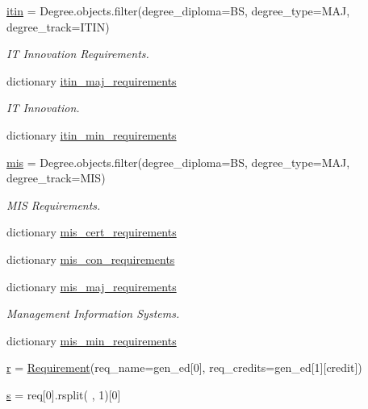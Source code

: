 \begin{DoxyCompactItemize}
\mbox{\hyperlink{namespacemavAgenda_1_1RequirementPreprocessing_ae97c34915a96370651628305d87909c2}{itin}} = Degree.\+objects.\+filter(degree\+\_\+diploma=\textquotesingle{}BS\textquotesingle{}, degree\+\_\+type=\textquotesingle{}M\+AJ\textquotesingle{}, degree\+\_\+track=\textquotesingle{}I\+T\+IN\textquotesingle{})
\begin{DoxyCompactList}\small\item\em IT Innovation Requirements. \end{DoxyCompactList}\item 
dictionary \mbox{\hyperlink{namespacemavAgenda_1_1RequirementPreprocessing_ac0a28a38bf1a9adfddfb79876e568219}{itin\+\_\+maj\+\_\+requirements}}
\begin{DoxyCompactList}\small\item\em IT Innovation. \end{DoxyCompactList}\item 
dictionary \mbox{\hyperlink{namespacemavAgenda_1_1RequirementPreprocessing_a0b1ac9c2ba9386bff64a0f3ef032cfeb}{itin\+\_\+min\+\_\+requirements}}
\item 
\mbox{\hyperlink{namespacemavAgenda_1_1RequirementPreprocessing_a209da90cd996d028eb448979246e2d92}{mis}} = Degree.\+objects.\+filter(degree\+\_\+diploma=\textquotesingle{}BS\textquotesingle{}, degree\+\_\+type=\textquotesingle{}M\+AJ\textquotesingle{}, degree\+\_\+track=\textquotesingle{}M\+IS\textquotesingle{})
\begin{DoxyCompactList}\small\item\em M\+IS Requirements. \end{DoxyCompactList}\item 
dictionary \mbox{\hyperlink{namespacemavAgenda_1_1RequirementPreprocessing_a8e814a7f1dbf40609b15287050470d6b}{mis\+\_\+cert\+\_\+requirements}}
\item 
dictionary \mbox{\hyperlink{namespacemavAgenda_1_1RequirementPreprocessing_ae9bada3e8377999d95fc386798504e88}{mis\+\_\+con\+\_\+requirements}}
\item 
dictionary \mbox{\hyperlink{namespacemavAgenda_1_1RequirementPreprocessing_af446bec540ec117f39618e9d9e193597}{mis\+\_\+maj\+\_\+requirements}}
\begin{DoxyCompactList}\small\item\em Management Information Systems. \end{DoxyCompactList}\item 
dictionary \mbox{\hyperlink{namespacemavAgenda_1_1RequirementPreprocessing_aca78a5da4630f662aeedafb9ef7a863c}{mis\+\_\+min\+\_\+requirements}}
\item 
\mbox{\hyperlink{namespacemavAgenda_1_1RequirementPreprocessing_afd34b3418f5b1e45bb01e7abfe14429f}{r}} = \mbox{\hyperlink{classmavAgenda_1_1landing_1_1models_1_1Requirement}{Requirement}}(req\+\_\+name=gen\+\_\+ed\mbox{[}0\mbox{]}, req\+\_\+credits=gen\+\_\+ed\mbox{[}1\mbox{]}\mbox{[}\textquotesingle{}credit\textquotesingle{}\mbox{]})
\item 
\mbox{\hyperlink{namespacemavAgenda_1_1RequirementPreprocessing_a8a823232792345a3486a1ce30c051626}{s}} = req\mbox{[}0\mbox{]}.rsplit(\textquotesingle{} \textquotesingle{}, 1)\mbox{[}0\mbox{]}
\end{DoxyCompactItemize}


